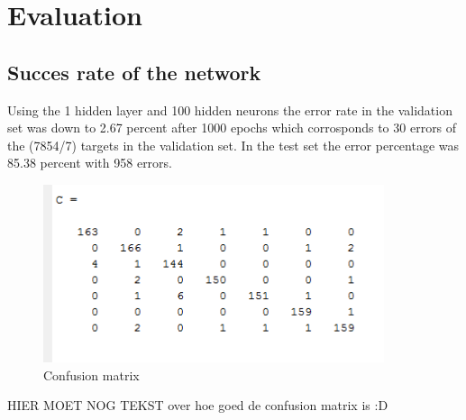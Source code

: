 \section{Evaluation} \label {chapter:evaluation}

\subsection{Succes rate of the network}
Using the 1 hidden layer and 100 hidden neurons the error rate in the validation set was down to 2.67 percent after 1000 epochs which corrosponds to 30 errors of the (7854/7) targets in the validation set. In the test set the error percentage was 85.38 percent with 958 errors.


\begin{figure}[!h]
\begin{center}
\includegraphics[width=10cm]{testresults/confusionmatrix.png}
\caption{Confusion matrix}
\label{confusion_matrixr}
\end{center}
\end{figure}
\FloatBarrier


HIER MOET NOG TEKST over hoe goed de confusion matrix is :D